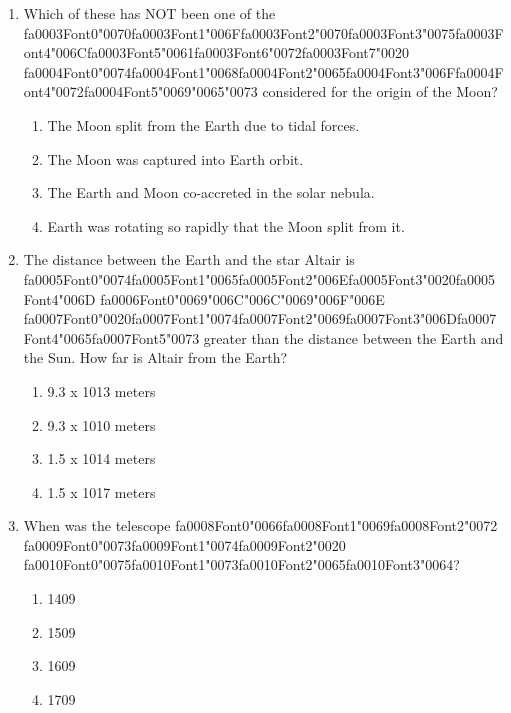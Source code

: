 \documentclass[12pt]{article}
\begin{document}
\begin{enumerate}[label=\arabic*.]
\item Which of these has NOT been one of the {\csname fa0003Font0\endcsname\char"0070}{\csname fa0003Font1\endcsname\char"006F}{\csname fa0003Font2\endcsname\char"0070}{\csname fa0003Font3\endcsname\char"0075}{\csname fa0003Font4\endcsname\char"006C}{\csname fa0003Font5\endcsname\char"0061}{\csname fa0003Font6\endcsname\char"0072}{\csname fa0003Font7\endcsname\char"0020} {\csname fa0004Font0\endcsname\char"0074}{\csname fa0004Font1\endcsname\char"0068}{\csname fa0004Font2\endcsname\char"0065}{\csname fa0004Font3\endcsname\char"006F}{\csname fa0004Font4\endcsname\char"0072}{\csname fa0004Font5\endcsname\char"0069}{\char"0065}{\char"0073} considered for the origin of the
Moon?
\begin{enumerate}[label=(\alph*)]
    \item The Moon split from the Earth due to tidal forces.
    \item The Moon was captured into Earth orbit.
    \item The Earth and Moon co-accreted in the solar nebula.
    \item Earth was rotating so rapidly that the Moon split from it.
\end{enumerate}
\item The distance between the Earth and the star Altair is {\csname fa0005Font0\endcsname\char"0074}{\csname fa0005Font1\endcsname\char"0065}{\csname fa0005Font2\endcsname\char"006E}{\csname fa0005Font3\endcsname\char"0020}{\csname fa0005Font4\endcsname\char"006D} {\csname fa0006Font0\endcsname\char"0069}{\char"006C}{\char"006C}{\char"0069}{\char"006F}{\char"006E} {\csname fa0007Font0\endcsname\char"0020}{\csname fa0007Font1\endcsname\char"0074}{\csname fa0007Font2\endcsname\char"0069}{\csname fa0007Font3\endcsname\char"006D}{\csname fa0007Font4\endcsname\char"0065}{\csname fa0007Font5\endcsname\char"0073} greater than the
distance between the Earth and the Sun. How far is Altair from the Earth?
\begin{enumerate}[label=(\alph*)]
    \item 9.3 x 1013 meters
    \item 9.3 x 1010 meters
    \item 1.5 x 1014 meters
    \item 1.5 x 1017 meters
\end{enumerate}
\item When was the telescope {\csname fa0008Font0\endcsname\char"0066}{\csname fa0008Font1\endcsname\char"0069}{\csname fa0008Font2\endcsname\char"0072} {\csname fa0009Font0\endcsname\char"0073}{\csname fa0009Font1\endcsname\char"0074}{\csname fa0009Font2\endcsname\char"0020} {\csname fa0010Font0\endcsname\char"0075}{\csname fa0010Font1\endcsname\char"0073}{\csname fa0010Font2\endcsname\char"0065}{\csname fa0010Font3\endcsname\char"0064}?
\begin{enumerate}[label=(\alph*)]
    \item 1409
    \item 1509
    \item 1609
    \item 1709
\end{enumerate}
\end{enumerate}
\end{document}

